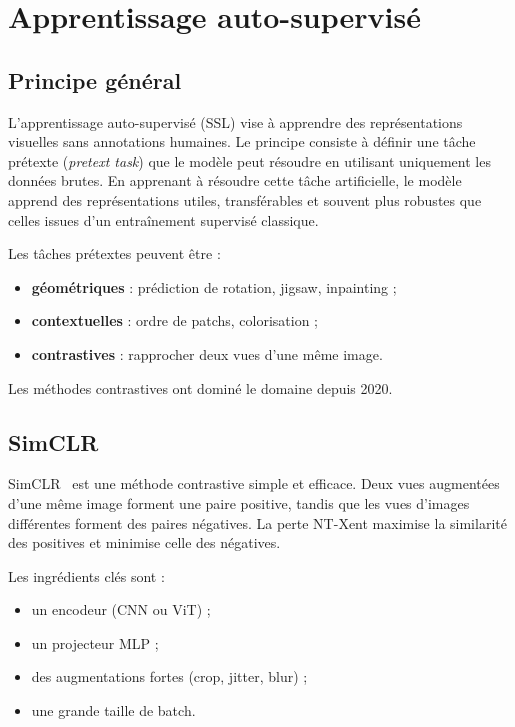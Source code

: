 \documentclass[12pt,a4paper]{report}
\begin{document}
	\section{Apprentissage auto-supervisé}
	
	\subsection{Principe général}
	
	L’apprentissage auto-supervisé (SSL) vise à apprendre des représentations visuelles sans annotations humaines. 
	Le principe consiste à définir une tâche prétexte (\emph{pretext task}) que le modèle peut résoudre en utilisant uniquement les données brutes. 
	En apprenant à résoudre cette tâche artificielle, le modèle apprend des représentations utiles, transférables et souvent plus robustes que celles issues d’un entraînement supervisé classique.
	
	Les tâches prétextes peuvent être :
	\begin{itemize}
		\item \textbf{géométriques} : prédiction de rotation, jigsaw, inpainting ;
		\item \textbf{contextuelles} : ordre de patchs, colorisation ;
		\item \textbf{contrastives} : rapprocher deux vues d’une même image.
	\end{itemize}
	
	Les méthodes contrastives ont dominé le domaine depuis 2020.
	
	\subsection{SimCLR}
	
	SimCLR~\cite{Chen2020} est une méthode contrastive simple et efficace.  
	Deux vues augmentées d’une même image forment une paire positive, tandis que les vues d’images différentes forment des paires négatives.  
	La perte NT-Xent maximise la similarité des positives et minimise celle des négatives.
	
	Les ingrédients clés sont :
	\begin{itemize}
		\item un encodeur (CNN ou ViT) ;
		\item un projecteur MLP ;
		\item des augmentations fortes (crop, jitter, blur) ;
		\item une grande taille de batch.
	\end{itemize}
	
\end{document}
